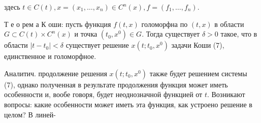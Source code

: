 \documentclass[10pt]{article}
\begin{document}
здесь $t \in C(t), x=\left(x_{1}, \ldots, x_{n}\right) \in C^{n}(x), f=\left(f_{1}, \ldots, f_{n}\right)$.



Т е о рем а К оши: пусть функция $f(t, x)$ голоморфна по $(t, x)$ в области $G \subset C(t) \times C^{n}(x)$ и точка $\left(t_{0}, x^{0}\right) \in G$. Тогда существует $\delta>0$ такое, что в области $\left|t-t_{0}\right|<\delta$ существует решение $x\left(t ; t_{0}, x^{0}\right)$ задачи Коши (7), единственное и голоморфное.



Аналитич. продолжение решения $x\left(t ; t_{0}, x^{0}\right)$ также будет решением системы (7), однако полученная в результате продолжения функция может иметь особенности и, вообе говоря, будет неоднозначной функцией от $t$. Возникают вопросы: какие особенности может иметь эта функция, как устроено решение в целом? В линей-
\end{document}
